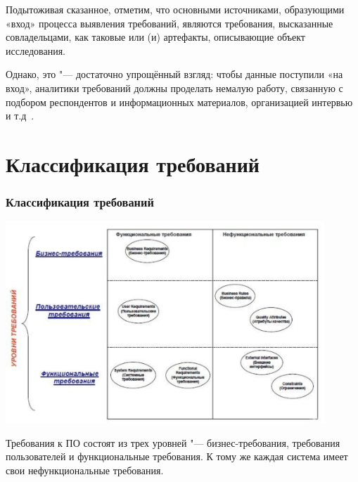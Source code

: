 \documentclass{../industrial-development}
\begin{document}
Подытоживая сказанное, отметим, что основными источниками, образующими «вход» процесса выявления требований, являются требования, высказанные совладельцами, как таковые или (и) артефакты, описывающие объект исследования.

Однако, это "--- достаточно упрощённый взгляд: чтобы данные поступили «на вход», аналитики требований должны проделать немалую работу, связанную с подбором респондентов и информационных материалов, организацией интервью и т.д~\cite[с.~29--30]{Maglinec}.


\section{Классификация требований}
\begin{frame} \frametitle{Классификация требований}
 \centerline{\includegraphics[width=0.9\textwidth]{pict1.pdf}}
\end{frame}

\lecturenotes

Требования к ПО состоят из трех уровней "--- бизнес-требования, требования пользователей и функциональные требования. К тому же каждая система имеет свои нефункциональные требования.
\end{document}
